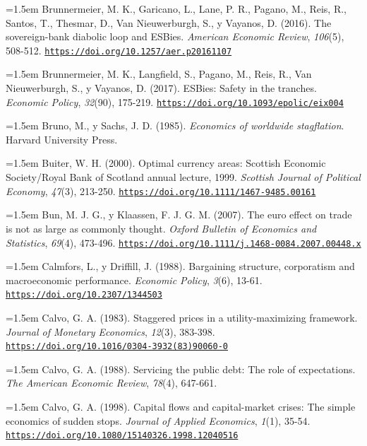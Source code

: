 \documentclass[10pt,a4paper]{article}
\begin{document}
\noindent\hangindent=1.5em Brunnermeier, M. K., Garicano, L., Lane, P. R., Pagano, M., Reis, R., Santos, T., Thesmar, D., Van Nieuwerburgh, S., y Vayanos, D. (2016). The sovereign-bank diabolic loop and ESBies. \textit{American Economic Review}, \textit{106}(5), 508-512. \href{https://doi.org/10.1257/aer.p20161107}{\nolinkurl{https://doi.org/10.1257/aer.p20161107}}

\noindent\hangindent=1.5em Brunnermeier, M. K., Langfield, S., Pagano, M., Reis, R., Van Nieuwerburgh, S., y Vayanos, D. (2017). ESBies: Safety in the tranches. \textit{Economic Policy}, \textit{32}(90), 175-219. \href{https://doi.org/10.1093/epolic/eix004}{\nolinkurl{https://doi.org/10.1093/epolic/eix004}}

\noindent\hangindent=1.5em Bruno, M., y Sachs, J. D. (1985). \textit{Economics of worldwide stagflation}. Harvard University Press.

\noindent\hangindent=1.5em Buiter, W. H. (2000). Optimal currency areas: Scottish Economic Society/Royal Bank of Scotland annual lecture, 1999. \textit{Scottish Journal of Political Economy}, \textit{47}(3), 213-250. \href{https://doi.org/10.1111/1467-9485.00161}{\nolinkurl{https://doi.org/10.1111/1467-9485.00161}}

\noindent\hangindent=1.5em Bun, M. J. G., y Klaassen, F. J. G. M. (2007). The euro effect on trade is not as large as commonly thought. \textit{Oxford Bulletin of Economics and Statistics}, \textit{69}(4), 473-496. \href{https://doi.org/10.1111/j.1468-0084.2007.00448.x}{\nolinkurl{https://doi.org/10.1111/j.1468-0084.2007.00448.x}}

\noindent\hangindent=1.5em Calmfors, L., y Driffill, J. (1988). Bargaining structure, corporatism and macroeconomic performance. \textit{Economic Policy}, \textit{3}(6), 13-61. \href{https://doi.org/10.2307/1344503}{\nolinkurl{https://doi.org/10.2307/1344503}}

\noindent\hangindent=1.5em Calvo, G. A. (1983). Staggered prices in a utility-maximizing framework. \textit{Journal of Monetary Economics}, \textit{12}(3), 383-398. \href{https://doi.org/10.1016/0304-3932(83)90060-0}{\nolinkurl{https://doi.org/10.1016/0304-3932(83)90060-0}}

\noindent\hangindent=1.5em Calvo, G. A. (1988). Servicing the public debt: The role of expectations. \textit{The American Economic Review}, \textit{78}(4), 647-661.

\noindent\hangindent=1.5em Calvo, G. A. (1998). Capital flows and capital-market crises: The simple economics of sudden stops. \textit{Journal of Applied Economics}, \textit{1}(1), 35-54. \href{https://doi.org/10.1080/15140326.1998.12040516}{\nolinkurl{https://doi.org/10.1080/15140326.1998.12040516}}
\end{document}
